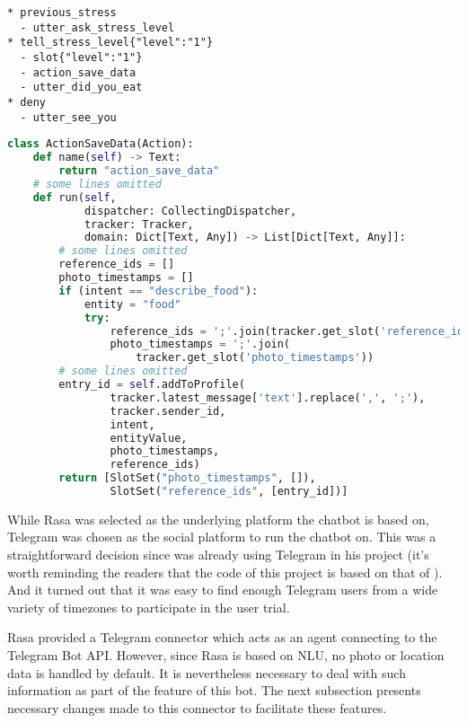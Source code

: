 \begin{lstlisting}[label={story_slot},caption={Using slots in stories to save user's stress level},captionpos=b]
* previous_stress
  - utter_ask_stress_level
* tell_stress_level{"level":"1"}
  - slot{"level":"1"}
  - action_save_data
  - utter_did_you_eat
* deny
  - utter_see_you
\end{lstlisting}

\bigskip
\begin{lstlisting}[label={action_slot},caption={Getting and setting slots in a custom action to relate entries in persistent data. "photo\_timestamps" and "reference\_ids" are used to find the correct photos to be send to the user in the future\, which help the user to reflect food.},language=Python,captionpos=b]
class ActionSaveData(Action):
    def name(self) -> Text:
        return "action_save_data"
    # some lines omitted
    def run(self,
            dispatcher: CollectingDispatcher,
            tracker: Tracker,
            domain: Dict[Text, Any]) -> List[Dict[Text, Any]]:
        # some lines omitted
        reference_ids = []
        photo_timestamps = []
        if (intent == "describe_food"):
            entity = "food"
            try:
                reference_ids = ';'.join(tracker.get_slot('reference_ids'))
                photo_timestamps = ';'.join(
                    tracker.get_slot('photo_timestamps'))
        # some lines omitted
        entry_id = self.addToProfile(
                tracker.latest_message['text'].replace(',', ';'),
                tracker.sender_id,
                intent,
                entityValue,
                photo_timestamps,
                reference_ids)
        return [SlotSet("photo_timestamps", []),
                SlotSet("reference_ids", [entry_id])]
\end{lstlisting}

\bigskip
While Rasa was selected as the underlying platform the chatbot is based on, Telegram was chosen as the social platform to run the chatbot on. This was a straightforward decision since \citeauthor{17_ludwig} was already using Telegram in his project (it's worth reminding the readers that the code of this project is based on that of \citeauthor{17_ludwig}). And it turned out that it was easy to find enough Telegram users from a wide variety of timezones to participate in the user trial.

Rasa provided a Telegram connector which acts as an agent connecting to the Telegram Bot API. However, since Rasa is based on NLU, no photo or location data is handled by default. It is nevertheless necessary to deal with such information as part of the feature of this bot. The next subsection presents necessary changes made to this connector to facilitate these features.


